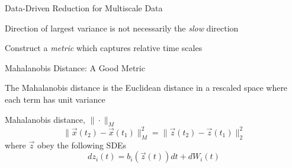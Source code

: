 \documentclass[12pt]{beamer}
\begin{document}
\begin{frame}{Data-Driven Reduction for Multiscale Data}

\centering
{\small Direction of largest variance is not necessarily the {\em slow} direction}


Construct a {\em metric} which captures relative time scales 

\end{frame}

\begin{frame}{Mahalanobis Distance: A Good Metric}

\centering
The Mahalanobis distance is the Euclidean distance in a rescaled space where each term has unit variance

\begin{block}{Mahalanobis distance, $\| \cdot \|_M$}
$$\| \vec{x}(t_2) - \vec{x}(t_1) \|^2_M = \| \vec{z}(t_2) - \vec{z}(t_1) \|^2_2$$
where $\vec{z}$ obey the following SDEs
$$dz_i(t) = b_i(\vec{z}(t)) dt + dW_i(t)$$
\end{block}

\end{frame}
\end{document}
